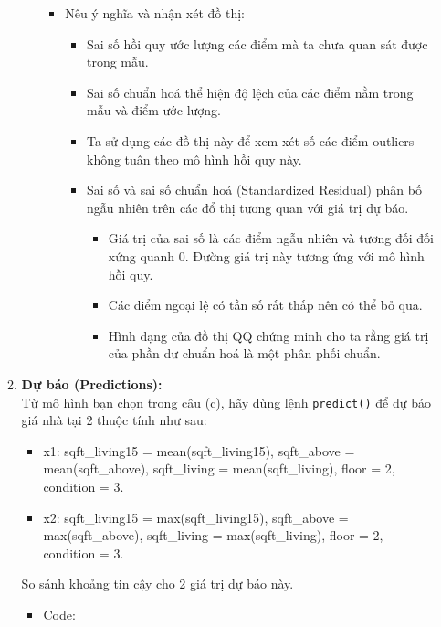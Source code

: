 \documentclass[a4paper]{article}
\theoremstyle{definition}
\begin{document}
\begin{itemize}
\begin{enumerate}
\begin{enumerate}
\begin{itemize}
            \item Nêu ý nghĩa và nhận xét đồ thị:
            \begin{itemize}
                \item Sai số hồi quy ước lượng các điểm mà ta chưa quan sát được trong mẫu.
                \item Sai số chuẩn hoá thể hiện độ lệch của các điểm nằm trong mẫu và điểm ước lượng.
                \item Ta sử dụng các đồ thị này để xem xét số các điểm outliers không tuân theo mô hình hồi quy này.
                \item  Sai số và sai số chuẩn hoá (Standardized Residual) phân bố ngẫu nhiên trên các đổ thị tương quan với giá trị dự báo.
                \begin{itemize}
                    \item Giá trị của sai số là các điểm ngẫu nhiên và tương đối đối xứng quanh 0. Đường giá trị này tương ứng với mô hình hồi quy.
                    \item Các điểm ngoại lệ có tần số rất thấp nên có thể bỏ qua.
                    \item Hình dạng của đồ thị QQ chứng minh cho ta rằng giá trị của phần dư chuẩn hoá là một phân phối chuẩn.
                \end{itemize}
            \end{itemize}
        \end{itemize}

    \end{enumerate}
    
    \item \textbf{Dự báo (Predictions):} \\
    Từ mô hình bạn chọn trong câu (c), hãy dùng lệnh \texttt{predict()} để dự báo giá nhà tại 2 thuộc tính như sau:
    \begin{itemize}
        \item[] x1: sqft\_living15 = mean(sqft\_living15), sqft\_above = mean(sqft\_above), sqft\_living = mean(sqft\_living), floor = 2, condition = 3.
        \item[] x2: sqft\_living15 = max(sqft\_living15), sqft\_above = max(sqft\_above), sqft\_living = max(sqft\_living), floor = 2, condition = 3.
    \end{itemize}
    So sánh khoảng tin cậy cho 2 giá trị dự báo này.
    
    \begin{itemize}
            \item Code:
        \end{itemize}
    

\end{enumerate}
\end{itemize}
\end{document}

